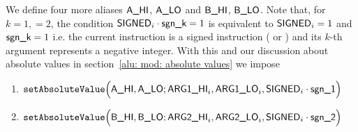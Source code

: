 We define four more aliases
$\textsf{A\_HI}$, $\textsf{A\_LO}$
and
$\textsf{B\_HI}$, $\textsf{B\_LO}$. Note that, for $k=1,=2$, the condition $\textsf{SIGNED}_{i} \cdot \textsf{sgn\_k} = 1$ is equivalent to
$\textsf{SIGNED}_{i} = 1$ and 
$\textsf{sgn\_k} = 1$
i.e. the current instruction is a signed instruction ( or ) 
and its $k$-th argument represents a negative integer. With this and our discussion about absolute values in 
section~\ref{alu: mod: absolute values} we impose
\begin{enumerate}
	\item $\texttt{setAbsoluteValue}
		\Big(
	\textsf{A\_HI}, \textsf{A\_LO};
	\textsf{ARG}\textsf{1}\textsf{\_HI}_{i}, \textsf{ARG}\textsf{1}\textsf{\_LO}_{i},
	\textsf{SIGNED}_{i} \cdot \textsf{sgn\_1}
	\Big)$
	\item $\texttt{setAbsoluteValue}
		\Big(
	\textsf{B\_HI}, \textsf{B\_LO};
	\textsf{ARG}\textsf{2}\textsf{\_HI}_{i}, \textsf{ARG}\textsf{2}\textsf{\_LO}_{i},
	\textsf{SIGNED}_{i} \cdot \textsf{sgn\_2}
	\Big)$
\end{enumerate}
